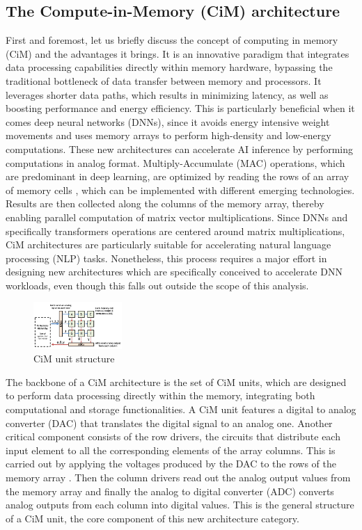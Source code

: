 \documentclass[conference]{IEEEtran}
\begin{document}
\subsection{The Compute-in-Memory (CiM) architecture}
First and foremost, let us briefly discuss the concept of computing in memory (CiM) and the advantages it brings. It is an innovative paradigm that integrates data processing capabilities directly within memory hardware, bypassing the traditional bottleneck of data transfer between memory and processors. It leverages shorter data paths, which results in minimizing latency, as well as boosting performance and energy efficiency.  
This is particularly beneficial when it comes deep neural networks (DNNs), since it avoids energy intensive weight movements and uses memory arrays to perform high-density and low-energy computations. These new architectures can accelerate AI inference by performing computations in analog format. Multiply-Accumulate (MAC) operations, which are predominant in deep learning, are optimized by reading the rows of an array of memory cells  \cite{wolters2024memory}, which can be implemented with different emerging technologies. Results are then collected along the columns of the memory array, thereby enabling parallel computation of matrix vector multiplications. Since DNNs and specifically transformers operations are centered around matrix multiplications, CiM architectures are particularly suitable for accelerating natural language processing (NLP) tasks.
Nonetheless, this process requires a major effort in designing new architectures which are specifically conceived to accelerate DNN workloads, even though this falls out outside the scope of this analysis.


\begin{figure}[ht]
    \centering
    \includegraphics[width=0.3\textwidth]{images/computing_in_memory.png}
    \caption{CiM unit structure}
\end{figure}

The backbone of a CiM architecture is the set of CiM units, which are designed to perform data processing directly within the memory, integrating both computational and storage functionalities. A CiM unit features a digital to analog converter (DAC) that translates the digital signal to an analog one. Another critical component consists of the row drivers, the circuits that distribute each input element to all the corresponding elements of the array columns. This is carried out by applying the voltages produced by the DAC to the rows of the memory array \cite{andrulis2024cimloopflexibleaccuratefast}. Then the column drivers read out the analog output values from the memory array and finally the analog to digital converter (ADC) converts analog outputs from each column into digital values. This is the general structure of a CiM unit, the core component of this new architecture category.
\end{document}
